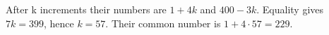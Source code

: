 After k increments their numbers are $1+4k$ and $400-3k$. Equality gives $7k=399$, hence $k=57$. Their common number is $1+4\cdot57=\boxed{229}$.
